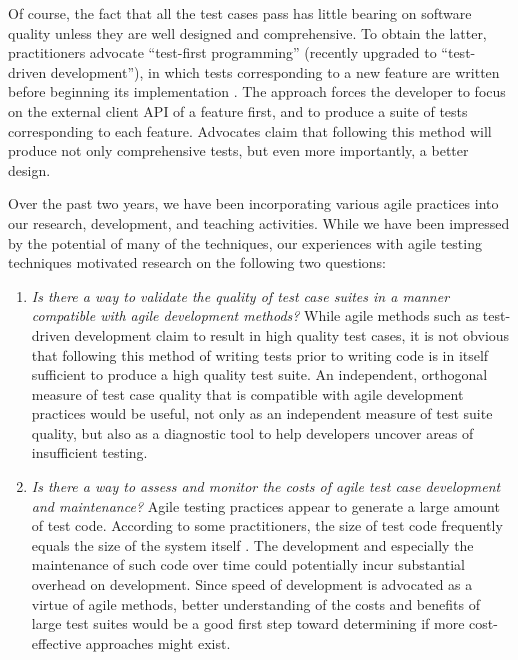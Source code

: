\documentclass[10pt,twocolumn]{article}
\begin{document}
Of course, the fact that all the test cases pass has little bearing on
software quality unless they are well designed and comprehensive. To obtain
the latter, practitioners advocate ``test-first programming'' (recently
upgraded to ``test-driven development''), in which tests corresponding
to a new feature are written before beginning its implementation
\cite{Beck:2003}. The approach forces the developer to focus on the
external client API of a feature first, and to produce a suite of tests
corresponding to each feature. Advocates claim that following this method
will produce not only comprehensive tests, but even more importantly, a
better design.
   
Over the past two years, we have been incorporating various agile practices
into our research, development, and teaching activities. While we have been
impressed by the potential of many of the techniques, our experiences
with agile testing techniques motivated research on the following two questions:

\begin{enumerate}
\item {\em Is there a way to validate the quality of test case suites in a
    manner compatible with agile development methods?} While agile methods
  such as test-driven development claim to result in high quality test
  cases, it is not obvious that following this method of writing tests
  prior to writing code is in itself sufficient to produce a high quality
  test suite.  An independent, orthogonal measure of test case quality that is
  compatible with agile development practices would be useful, not only as
  an independent measure of test suite quality, but also as a diagnostic
  tool to help developers uncover areas of insufficient testing.

\item {\em Is there a way to assess and
  monitor the costs of agile test case development and maintenance?}  Agile
  testing practices appear to generate a large amount of test code.
  According to some practitioners, the size of test code frequently equals
  the size of the system itself \cite{Beck:2003}.  The development and especially the
  maintenance of such code over time could potentially incur substantial
  overhead on development. Since speed of development is advocated as a
  virtue of agile methods, better understanding of the costs and benefits
  of large test suites would be a good first step toward determining if
  more cost-effective approaches might exist.

\end{enumerate}
\end{document}
